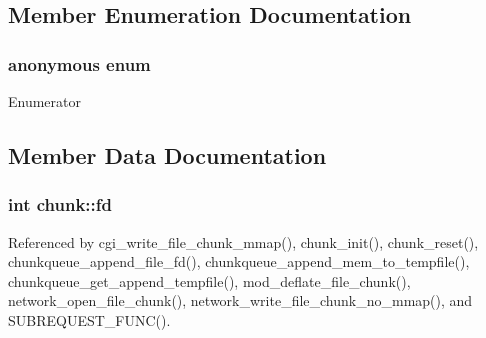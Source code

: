 \subsection{Member Enumeration Documentation}
\hypertarget{structchunk_a0a4cd7a7cc3e8a52c2fb512c914c7e50}{\subsubsection[{anonymous enum}]{\setlength{\rightskip}{0pt plus 5cm}anonymous enum}}\label{structchunk_a0a4cd7a7cc3e8a52c2fb512c914c7e50}
\begin{Desc}
\item[Enumerator]\par
\begin{description}
\item[{\em 
\hypertarget{structchunk_a0a4cd7a7cc3e8a52c2fb512c914c7e50a372c61a9cfe36a8bb38fb8ad6e96008c}{M\-E\-M\-\_\-\-C\-H\-U\-N\-K}\label{structchunk_a0a4cd7a7cc3e8a52c2fb512c914c7e50a372c61a9cfe36a8bb38fb8ad6e96008c}
}]\item[{\em 
\hypertarget{structchunk_a0a4cd7a7cc3e8a52c2fb512c914c7e50af54b3bc03a4d1ab9df03c975240e44d9}{F\-I\-L\-E\-\_\-\-C\-H\-U\-N\-K}\label{structchunk_a0a4cd7a7cc3e8a52c2fb512c914c7e50af54b3bc03a4d1ab9df03c975240e44d9}
}]\end{description}
\end{Desc}


\subsection{Member Data Documentation}
\hypertarget{structchunk_ac23ae6ff22ccdaddc246c15c181a5410}{
\subsubsection[{fd}]{\setlength{\rightskip}{0pt plus 5cm}int chunk\-::fd}}\label{structchunk_ac23ae6ff22ccdaddc246c15c181a5410}


Referenced by cgi\-\_\-write\-\_\-file\-\_\-chunk\-\_\-mmap(), chunk\-\_\-init(), chunk\-\_\-reset(), chunkqueue\-\_\-append\-\_\-file\-\_\-fd(), chunkqueue\-\_\-append\-\_\-mem\-\_\-to\-\_\-tempfile(), chunkqueue\-\_\-get\-\_\-append\-\_\-tempfile(), mod\-\_\-deflate\-\_\-file\-\_\-chunk(), network\-\_\-open\-\_\-file\-\_\-chunk(), network\-\_\-write\-\_\-file\-\_\-chunk\-\_\-no\-\_\-mmap(), and S\-U\-B\-R\-E\-Q\-U\-E\-S\-T\-\_\-\-F\-U\-N\-C().

